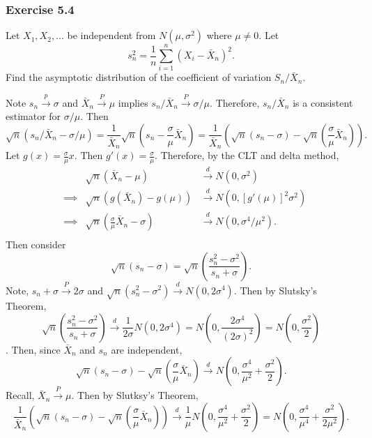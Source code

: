 \documentclass[12pt,]{article}
\begin{document}
\hypertarget{exercise-5.4}{%
\subsubsection{Exercise 5.4}\label{exercise-5.4}}

Let \(X_1, X_2, ...\) be independent from \(N(\mu,\sigma^2)\) where
\(\mu \ne 0\). Let \[s_n^2=\frac{1}{n}\sum_{i=1}^n(X_i-\bar X_n)^2.\]
Find the asymptotic distribution of the coefficient of variation
\(S_n/\bar X_n.\)

Note \(s_n\overset{p}\rightarrow \sigma\) and
\(\bar X_n \overset{P}\rightarrow \mu\) implies
\(s_n/\bar X_n\overset{P}\rightarrow \sigma/\mu.\) Therefore,
\(s_n/\bar X_n\) is a consistent estimator for \(\sigma/\mu.\) Then
\[\sqrt{n}\left(s_n/\bar X_n-\sigma/\mu\right)=\frac{1}{\bar X_n}\sqrt{n}\left(s_n-\frac{\sigma}{\mu}\bar X_n\right)=\frac{1}{\bar X_n}\left(\sqrt{n}(s_n-\sigma)-\sqrt{n}\left(\frac{\sigma}{\mu}\bar X_n\right)\right).\]
Let \(g(x) = \frac{\sigma}{\mu}x.\) Then \(g'(x)=\frac{\sigma}{\mu}.\)
Therefore, by the CLT and delta method, \begin{align*}
&&\sqrt{n}(\bar X_n-\mu)&\overset{d}\rightarrow N(0,\sigma^2)\\
&\implies&\sqrt{n}(g(\bar X_n)-g(\mu))&\overset{d}\rightarrow N(0,[g'(\mu)]^2\sigma^2)\\
&\implies&\sqrt{n}(\frac{\sigma}{\mu}\bar X_n-\sigma)&\overset{d}\rightarrow N(0,\sigma^4/\mu^2).\\
\end{align*} Then consider
\[\sqrt{n}(s_n-\sigma)=\sqrt{n}\left(\frac{s_n^2-\sigma^2}{s_n+\sigma}\right).\]
Note, \(s_n+\sigma\overset{P}\rightarrow 2\sigma\) and
\(\sqrt{n}(s_n^2-\sigma^2)\overset{d}\rightarrow N(0,2\sigma^4).\) Then
by Slutsky's Theorem,
\[\sqrt{n}\left(\frac{s_n^2-\sigma^2}{s_n+\sigma}\right)\overset{d}\rightarrow \frac{1}{2\sigma}N(0,2\sigma^4)=N\left(0, \frac{2\sigma^4}{(2\sigma)^2}\right)=N\left(0, \frac{\sigma^2}{2}\right)\].
Then, since \(\bar X_n\) and \(s_n\) are independent,
\[\sqrt{n}(s_n-\sigma)-\sqrt{n}\left(\frac{\sigma}{\mu}\bar X_n\right)\overset{d}\rightarrow N\left(0, \frac{\sigma^4}{\mu^2}+\frac{\sigma^2}{2}\right).\]
Recall, \(\bar X_n \overset{P}\rightarrow \mu.\) Then by Slutksy's
Theorem,
\[\frac{1}{\bar X_n}\left(\sqrt{n}(s_n-\sigma)-\sqrt{n}\left(\frac{\sigma}{\mu}\bar X_n\right)\right)\overset{d}\rightarrow \frac{1}{\mu}N\left(0, \frac{\sigma^4}{\mu^2}+\frac{\sigma^2}{2}\right)=N\left(0, \frac{\sigma^4}{\mu^4}+\frac{\sigma^2}{2\mu^2}\right).\]
\end{document}
